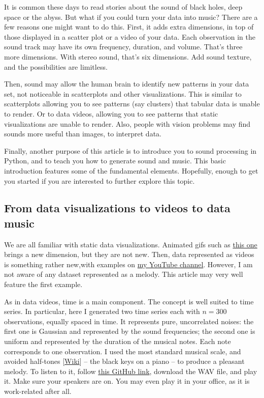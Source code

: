\documentclass[oneside,10pt]{book}
\begin{document}
It is common these days to read stories about the sound of black holes, deep space or the abyss. But what if you could turn your data into music? There are a few reasons one might want to do this. First, it adds extra dimensions, in top of those displayed in a scatter plot or a video of your data. Each observation in the sound track may have its own frequency, duration, and volume. That’s three more dimensions. With stereo sound, that’s six dimensions. Add sound texture, and the possibilities are limitless.

Then, sound may allow the human brain to identify new patterns in your data set, not noticeable in scatterplots and other visualizations. This is similar to scatterplots allowing you to see patterns (say clusters) that tabular data is unable to render. Or to data videos, allowing you to see patterns that static visualizations are unable to render. Also, people with vision problems may find sounds more useful than images, to interpret data.

Finally, another purpose of this article is to introduce you to sound processing in Python, and to teach you how to generate sound and music. This basic introduction features some of the fundamental elements. Hopefully, enough to get you started if you are interested to further explore this topic.

\subsection{From data visualizations to videos to data music}

We are all familiar with static data visualizations. Animated gifs such as \href{https://mltechniques.com/2022/04/20/computer-vision-shape-classification-via-explainable-ai/}{this one} brings a new dimension, but they are not new. Then, data represented as videos is something rather new,with examples on \href{https://www.youtube.com/c/VincentGranvilleVideos}{my YouTube channel}. However, I am not aware of any dataset represented as a melody. This article may very well feature the first example.

As in data videos, time is a main component. The concept is well suited to time series. In particular, here I generated two time series each with
$n = 300$ observations, equally spaced in time. It represents pure, uncorrelated noises: the first one is Gaussian and represented by the sound frequencies; the second one is uniform and represented by the duration of the musical notes. Each note corresponds to one observation. I used the most standard musical scale, and avoided \textcolor{index}{half-tones} [\href{https://en.wikipedia.org/wiki/Semitone}{Wiki}] -- the black keys on a piano -- to produce a pleasant melody. To listen to it, follow \href{https://github.com/VincentGranville/Machine-Learning/blob/main/Images/sound.wav}{this GitHub link}, download the WAV file, and play it. Make sure your speakers are on. You may even play it in your office, as it is work-related after all.
\end{document}
